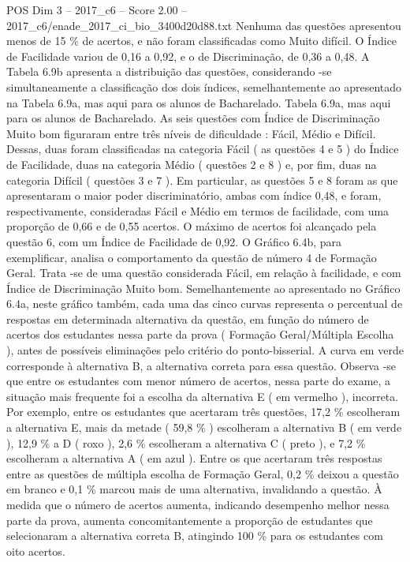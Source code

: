 \begin{textsample}{POS Dim 3 – 2017\_c6 – Score 2.00 – 2017\_c6/enade\_2017\_ci\_bio\_3400d20d88.txt}
Nenhuma das questões apresentou menos de 15 \% de acertos, e não foram classificadas como Muito difícil.
O Índice de Facilidade variou de 0,16 a 0,92, e o de Discriminação, de 0,36 a 0,48.
A Tabela 6.9b apresenta a distribuição das questões, considerando -se simultaneamente a classificação dos dois índices, semelhantemente ao apresentado na Tabela 6.9a, mas aqui para os alunos de Bacharelado.
Tabela 6.9a, mas aqui para os alunos de Bacharelado.
As seis questões com Índice de Discriminação Muito bom figuraram entre três níveis de dificuldade : Fácil, Médio e Difícil.
Dessas, duas foram classificadas na categoria Fácil ( as questões 4 e 5 ) do Índice de Facilidade, duas na categoria Médio ( questões 2 e 8 ) e, por fim, duas na categoria Difícil ( questões 3 e 7 ).
Em particular, as questões 5 e 8 foram as que apresentaram o maior poder discriminatório, ambas com índice 0,48, e foram, respectivamente, consideradas Fácil e Médio em termos de facilidade, com uma proporção de 0,66 e de 0,55 acertos.
O máximo de acertos foi alcançado pela questão 6, com um Índice de Facilidade de 0,92.
O Gráfico 6.4b, para exemplificar, analisa o comportamento da questão de número 4 de Formação Geral.
Trata -se de uma questão considerada Fácil, em relação à facilidade, e com Índice de Discriminação Muito bom.
Semelhantemente ao apresentado no Gráfico 6.4a, neste gráfico também, cada uma das cinco curvas representa o percentual de respostas em determinada alternativa da questão, em função do número de acertos dos estudantes nessa parte da prova ( Formação Geral/Múltipla Escolha ), antes de possíveis eliminações pelo critério do ponto-bisserial.
A curva em verde corresponde à alternativa B, a alternativa correta para essa questão.
Observa -se que entre os estudantes com menor número de acertos, nessa parte do exame, a situação mais frequente foi a escolha da alternativa E ( em vermelho ), incorreta.
Por exemplo, entre os estudantes que acertaram três questões, 17,2 \% escolheram a alternativa E, mais da metade ( 59,8 \% ) escolheram a alternativa B ( em verde ), 12,9 \% a D ( roxo ), 2,6 \% escolheram a alternativa C ( preto ), e 7,2 \% escolheram a alternativa A ( em azul ).
Entre os que acertaram três respostas entre as questões de múltipla escolha de Formação Geral, 0,2 \% deixou a questão em branco e 0,1 \% marcou mais de uma alternativa, invalidando a questão.
À medida que o número de acertos aumenta, indicando desempenho melhor nessa parte da prova, aumenta concomitantemente a proporção de estudantes que selecionaram a alternativa correta B, atingindo 100 \% para os estudantes com oito acertos.

\end{textsample}
